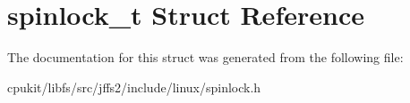 \hypertarget{structspinlock__t}{}\section{spinlock\+\_\+t Struct Reference}
\label{structspinlock__t}


The documentation for this struct was generated from the following file\+:\begin{DoxyCompactItemize}
\item 
cpukit/libfs/src/jffs2/include/linux/spinlock.\+h\end{DoxyCompactItemize}
